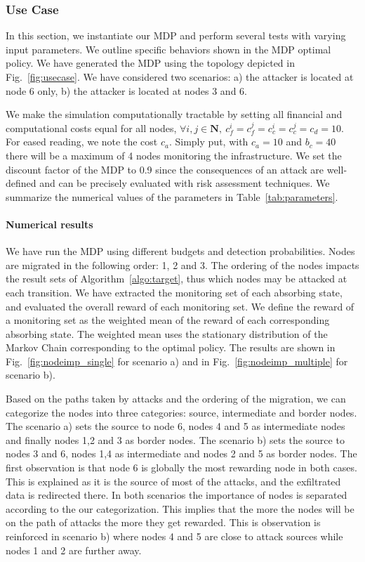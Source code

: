 \subsubsection{Use Case}
\label{sec:numericalres}
In this section, we instantiate our MDP and perform several tests with varying input parameters.
We outline specific behaviors shown in the MDP optimal policy.
We have generated the MDP using the topology depicted in Fig.~\ref{fig:usecase}.
We have considered two scenarios: a) the attacker is located at node 6 only, b) the attacker is located at nodes 3 and 6.

We make the simulation computationally tractable by setting all financial and computational costs equal for all nodes, \ie $\forall i,j\in \textbf{N},~c_f^i=c_f^j=c_c^i=c_c^j=c_d=10$. For eased reading, we note the cost $c_a$.
Simply put, with $c_a=10$ and $b_c=40$ there will be a maximum of 4 nodes monitoring the infrastructure.
We set the discount factor of the MDP to 0.9 since the consequences of an attack are well-defined and can be precisely evaluated with risk assessment techniques.
We summarize the numerical values of the parameters in Table~\ref{tab:parameters}.





\paragraph{Numerical results}
We have run the MDP using different budgets and detection probabilities.
Nodes are migrated in the following order: 1, 2 and 3.
The ordering of the nodes impacts the result sets of Algorithm~\ref{algo:target}, thus which nodes may be attacked at each transition.
We have extracted the monitoring set of each absorbing state, and evaluated the overall reward of each monitoring set.
We define the reward of a monitoring set as the weighted mean of the reward of each corresponding absorbing state.
The weighted mean uses the stationary distribution of the Markov Chain corresponding to the optimal policy.
The results are shown in Fig.~\ref{fig:nodeimp_single} for scenario a) and in Fig.~\ref{fig:nodeimp_multiple} for scenario b).

Based on the paths taken by attacks and the ordering of the migration, we can categorize the nodes into three categories: source, intermediate and border nodes.
The scenario a) sets the source to node 6, nodes 4 and 5 as intermediate nodes and finally nodes 1,2 and 3 as border nodes.
The scenario b) sets the source to nodes 3 and 6, nodes 1,4 as intermediate and nodes 2 and 5 as border nodes.
The first observation is that node 6 is globally the most rewarding node in both cases.
This is explained as it is the source of most of the attacks, and the exfiltrated data is redirected there.
In both scenarios the importance of nodes is separated according to the our categorization. 
This implies that the more the nodes will be on the path of attacks the more they get rewarded.
This is observation is reinforced in scenario b) where nodes 4 and 5 are close to attack sources while nodes 1 and 2 are further away.

